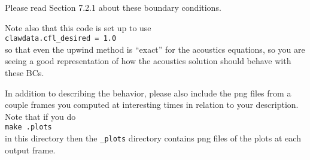 \documentclass[11pt]{article}
\begin{document}
Please read Section 7.2.1 about these boundary conditions.

Note also that this code is set up to use\\
{\tt clawdata.cfl\_desired = 1.0}\\
so that even the upwind method is ``exact'' for the acoustics equations, so you are seeing a good representation of how the acoustics solution should behave with these BCs.

In addition to describing the behavior, please also include the png files from a couple frames you computed at interesting times in relation to your description.  Note that if you do \\
{\tt make .plots} \\
in this directory then the {\tt \_plots} directory contains png files of the plots at each output frame.
 

\end{document}
